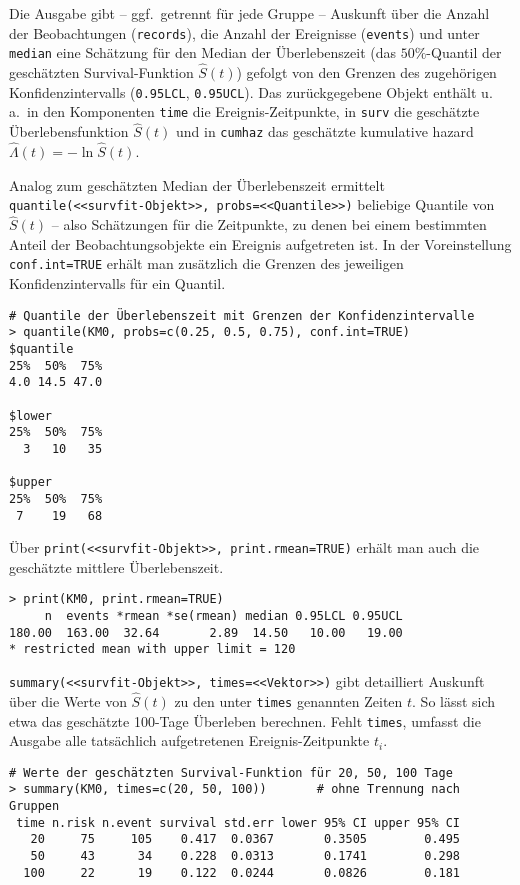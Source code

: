 Die Ausgabe gibt -- ggf.\ getrennt für jede Gruppe -- Auskunft über die Anzahl der Beobachtungen (\lstinline!records!), die Anzahl der Ereignisse (\lstinline!events!) und unter \lstinline!median! eine Schätzung für den Median der Überlebenszeit (das $50 \%$-Quantil der geschätzten Survival-Funktion $\hat{S}(t)$) gefolgt von den Grenzen des zugehörigen Konfidenzintervalls (\lstinline!0.95LCL!, \lstinline!0.95UCL!). Das zurückgegebene Objekt enthält u.\,a.\ in den Komponenten \lstinline!time! die Ereignis-Zeitpunkte, in \lstinline!surv! die geschätzte Überlebensfunktion $\hat{S}(t)$ und in \lstinline!cumhaz! das geschätzte kumulative hazard $\hat{\Lambda}(t) = -\ln \hat{S}(t)$.

Analog zum geschätzten Median der Überlebenszeit ermittelt \lstinline!quantile(<<survfit-Objekt>>, probs=<<Quantile>>)! beliebige Quantile von $\hat{S}(t)$ -- also Schätzungen für die Zeitpunkte, zu denen bei einem bestimmten Anteil der Beobachtungsobjekte ein Ereignis aufgetreten ist. In der Voreinstellung \lstinline!conf.int=TRUE! erhält man zusätzlich die Grenzen des jeweiligen Konfidenzintervalls für ein Quantil.
\begin{lstlisting}
# Quantile der Überlebenszeit mit Grenzen der Konfidenzintervalle
> quantile(KM0, probs=c(0.25, 0.5, 0.75), conf.int=TRUE)
$quantile
25%  50%  75%
4.0 14.5 47.0

$lower
25%  50%  75%
  3   10   35

$upper
25%  50%  75%
 7    19   68
\end{lstlisting}

Über \lstinline!print(<<survfit-Objekt>>, print.rmean=TRUE)! erhält man auch die geschätzte mittlere Überlebenszeit.
\begin{lstlisting}
> print(KM0, print.rmean=TRUE)
     n  events *rmean *se(rmean) median 0.95LCL 0.95UCL
180.00  163.00  32.64       2.89  14.50   10.00   19.00
* restricted mean with upper limit = 120
\end{lstlisting}

\lstinline!summary(<<survfit-Objekt>>, times=<<Vektor>>)! gibt detailliert Auskunft über die Werte von $\hat{S}(t)$ zu den unter \lstinline!times! genannten Zeiten $t$. So lässt sich etwa das geschätzte 100-Tage Überleben berechnen. Fehlt \lstinline!times!, umfasst die Ausgabe alle tatsächlich aufgetretenen Ereignis-Zeitpunkte $t_{i}$.
\begin{lstlisting}
# Werte der geschätzten Survival-Funktion für 20, 50, 100 Tage
> summary(KM0, times=c(20, 50, 100))       # ohne Trennung nach Gruppen
 time n.risk n.event survival std.err lower 95% CI upper 95% CI
   20     75     105    0.417  0.0367       0.3505        0.495
   50     43      34    0.228  0.0313       0.1741        0.298
  100     22      19    0.122  0.0244       0.0826        0.181
\end{lstlisting}

